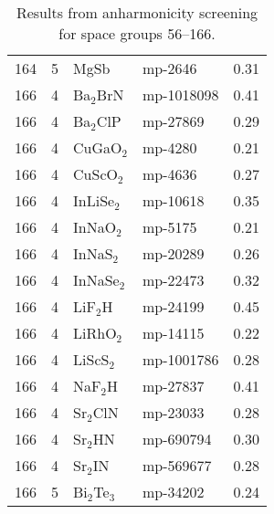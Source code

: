 \begin{table}[h!]
\begin{tabular}{rrllr}
         164 &            5 &         MgSb &    mp-2646 &       0.31 \\
         166 &            4 &    Ba$_2$BrN & mp-1018098 &       0.41 \\
         166 &            4 &    Ba$_2$ClP &   mp-27869 &       0.29 \\
         166 &            4 &    CuGaO$_2$ &    mp-4280 &       0.21 \\
         166 &            4 &    CuScO$_2$ &    mp-4636 &       0.27 \\
         166 &            4 &   InLiSe$_2$ &   mp-10618 &       0.35 \\
         166 &            4 &    InNaO$_2$ &    mp-5175 &       0.21 \\
         166 &            4 &    InNaS$_2$ &   mp-20289 &       0.26 \\
         166 &            4 &   InNaSe$_2$ &   mp-22473 &       0.32 \\
         166 &            4 &     LiF$_2$H &   mp-24199 &       0.45 \\
         166 &            4 &    LiRhO$_2$ &   mp-14115 &       0.22 \\
         166 &            4 &    LiScS$_2$ & mp-1001786 &       0.28 \\
         166 &            4 &     NaF$_2$H &   mp-27837 &       0.41 \\
         166 &            4 &    Sr$_2$ClN &   mp-23033 &       0.28 \\
         166 &            4 &     Sr$_2$HN &  mp-690794 &       0.30 \\
         166 &            4 &     Sr$_2$IN &  mp-569677 &       0.28 \\
         166 &            5 & Bi$_2$Te$_3$ &   mp-34202 &       0.24 \\
\bottomrule
\end{tabular}
   \caption{Results from anharmonicity screening for space groups 56--166.}
   \label{tab:screening.sigma.1}
 \end{table}         
  

